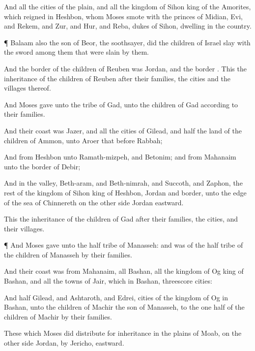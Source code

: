 {And all the
cities of the
plain, and all the
kingdom of
Sihon
king of the
Amorites, which
reigned in
Heshbon, whom
Moses
smote with the
princes of
Midian,
Evi, and
Rekem, and
Zur, and
Hur, and
Reba,
{}
dukes of
Sihon,
dwelling in the
country.


\par }{\PP {}¶
Balaam also the
son of
Beor, the
soothsayer, did the
children of
Israel
slay with the
sword among
them that were
slain by them.

And the
border of the
children of
Reuben was
Jordan, and the
border
{}. This
{} the
inheritance of the
children of
Reuben after their
families, the
cities and the
villages thereof.

And
Moses
gave
{} unto the
tribe of
Gad,
{} unto the
children of
Gad according to their
families.

And their
coast was
Jazer, and all the
cities of
Gilead, and
half the
land of the
children of
Ammon, unto
Aroer that
{}
before
Rabbah;

And from
Heshbon unto
Ramath-mizpeh, and
Betonim; and from
Mahanaim unto the
border of
Debir;

And in the
valley,
Beth-aram, and
Beth-nimrah, and
Succoth, and
Zaphon, the
rest of the
kingdom of
Sihon
king of
Heshbon,
Jordan and
{}
border,
{} unto the
edge of the
sea of
Chinnereth on the other
side
Jordan
eastward.

This
{} the
inheritance of the
children of
Gad after their
families, the
cities, and their
villages.


\par }{\PP {}¶ And
Moses
gave
{} unto the
half
tribe of
Manasseh: and
{} was
{} of the
half
tribe of the
children of
Manasseh by their
families.

And their
coast was from
Mahanaim, all
Bashan, all the
kingdom of
Og
king of
Bashan, and all the
towns of
Jair, which
{} in
Bashan,
threescore
cities:

And
half
Gilead, and
Ashtaroth, and
Edrei,
cities of the
kingdom of
Og in
Bashan,
{} unto the
children of
Machir the
son of
Manasseh,
{} to the one
half of the
children of
Machir by their
families.

These
{} which
Moses did distribute for
inheritance in the
plains of
Moab, on the other
side
Jordan, by
Jericho,
eastward.

}
